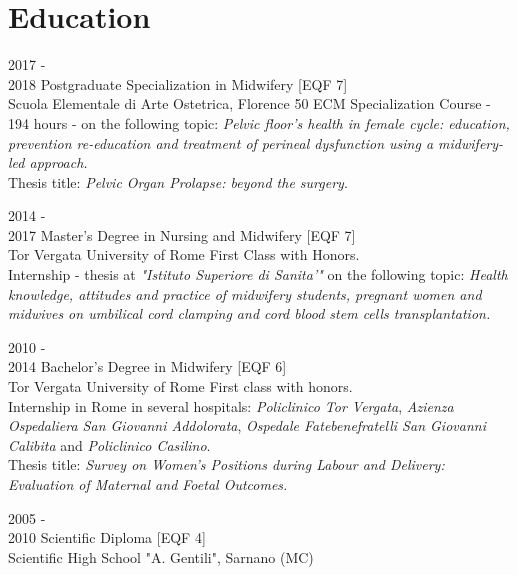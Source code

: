 \documentclass[11pt]{friggeri-cv}
\begin{document}
\section{Education}
\begin{entrylist}
  \entry
  {2017 - \\2018}
  {Postgraduate Specialization in Midwifery [\small EQF 7]}
  {\\Scuola Elementale di Arte Ostetrica, Florence}
  {50 ECM Specialization Course - 194 hours - on the following topic: 
  \emph{Pelvic floor's health in female cycle: education, prevention 
  re-education and treatment of perineal dysfunction using a midwifery-led 
  approach.}\\
  Thesis title: \emph{Pelvic Organ Prolapse: beyond the surgery}.\\}
  
  \entry
  {2014 - \\2017}
  {Master's Degree in Nursing and Midwifery [\small EQF 7]}
  {\\Tor Vergata University of Rome}
  {First Class with Honors. \\Internship - thesis at \textit{"Istituto 
  Superiore di Sanita'"} on the following topic: \textit{Health knowledge, 
  attitudes and practice of midwifery students, pregnant women and midwives on 
  umbilical cord clamping and cord blood stem cells transplantation.}\\}
  
  \entry
  {2010 - \\2014}
  {Bachelor's Degree in Midwifery [\small EQF 6]}
  {\\Tor Vergata University of Rome}
  {First class with honors.\\
  Internship in Rome in several hospitals: \textit{Policlinico Tor Vergata}, 
  \textit{Azienza Ospedaliera San Giovanni Addolorata}, \textit{Ospedale 
  Fatebenefratelli San Giovanni Calibita} and \textit{Policlinico Casilino}.\\
  Thesis title: \textit{Survey on Women's Positions during Labour and Delivery: 
  Evaluation of Maternal and Foetal Outcomes.}\\}
  
  \entry
  {2005 - \\2010}
  {Scientific Diploma [\small EQF 4]}
  {\\Scientific High School "A. Gentili", Sarnano (MC)}
  {}
\end{entrylist}

\vspace{-20pt}
\end{document}
